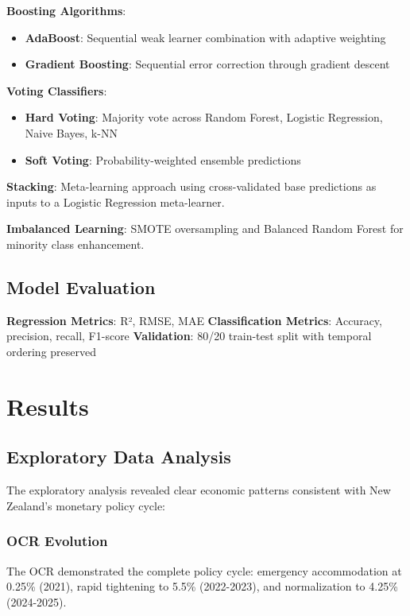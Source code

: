 \documentclass[11pt,a4paper]{article}
\begin{document}
	\textbf{Boosting Algorithms}:
	\begin{itemize}
		\item \textbf{AdaBoost}: Sequential weak learner combination with adaptive weighting
		\item \textbf{Gradient Boosting}: Sequential error correction through gradient descent
	\end{itemize}
	
	\textbf{Voting Classifiers}:
	\begin{itemize}
		\item \textbf{Hard Voting}: Majority vote across Random Forest, Logistic Regression, Naive Bayes, k-NN
		\item \textbf{Soft Voting}: Probability-weighted ensemble predictions
	\end{itemize}
	
	\textbf{Stacking}: Meta-learning approach using cross-validated base predictions as inputs to a Logistic Regression meta-learner.
	
	\textbf{Imbalanced Learning}: SMOTE oversampling and Balanced Random Forest for minority class enhancement.
	
	\subsection{Model Evaluation}
	\textbf{Regression Metrics}: R², RMSE, MAE
	\textbf{Classification Metrics}: Accuracy, precision, recall, F1-score
	\textbf{Validation}: 80/20 train-test split with temporal ordering preserved
	
	\section{Results}
	
	\subsection{Exploratory Data Analysis}
	
	The exploratory analysis revealed clear economic patterns consistent with New Zealand's monetary policy cycle:
	
	\subsubsection{OCR Evolution}
	The OCR demonstrated the complete policy cycle: emergency accommodation at 0.25\% (2021), rapid tightening to 5.5\% (2022-2023), and normalization to 4.25\% (2024-2025).
	
\end{document}
